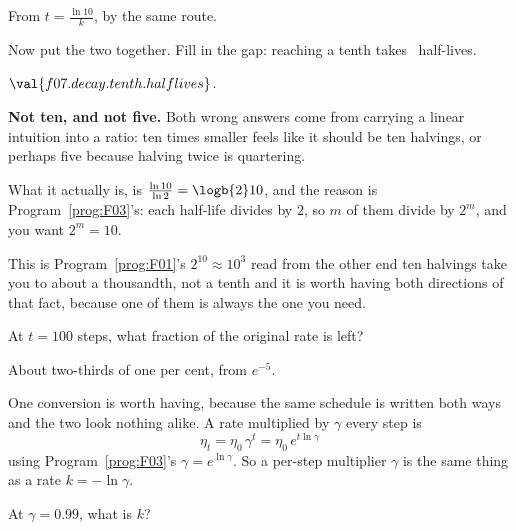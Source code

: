 \begin{fr}
From $t = \frac{\ln 10}{k}$, by the same route.

Now put the two together. Fill in the gap: reaching a tenth takes
\blank\ half-lives.
\dotline
\nextframe
\end{fr}

\begin{fr}
\begin{ansblock}
$\val{f07.decay.tenth.halflives}$.
\end{ansblock}

\begin{trapbox}
\textbf{Not ten, and not five.} Both wrong answers come from carrying a linear
intuition into a ratio: ten times smaller feels like it should be ten halvings,
or perhaps five because halving twice is quartering.

What it actually is, is $\frac{\ln 10}{\ln 2} = \logb{2} 10$, and the reason is
Program~\ref{prog:F03}'s: each half-life divides by $2$, so $m$ of them divide
by $2^{m}$, and you want $2^{m} = 10$.

This is Program~\ref{prog:F01}'s $2^{10} \approx 10^{3}$ read from the other
end \dash{} ten halvings take you to about a thousandth, not a tenth \dash{}
and it is worth having both directions of that fact, because one of them is
always the one you need.
\end{trapbox}

At $t = 100$ steps, what fraction of the original rate is left?
\nextframe
\end{fr}

\begin{fr}
About two-thirds of one per cent, from $e^{-5}$.

One conversion is worth having, because the same schedule is written both
ways and the two look nothing alike. A rate multiplied by $\gamma$ every step
is
\[ \eta_t = \eta_0\,\gamma^{t} = \eta_0\,e^{t\ln\gamma} \]
using Program~\ref{prog:F03}'s $\gamma = e^{\ln\gamma}$. So a per-step
multiplier $\gamma$ is the same thing as a rate $k = -\ln\gamma$.

At $\gamma = \num{0.99}$, what is $k$?
\nextframe
\end{fr}

